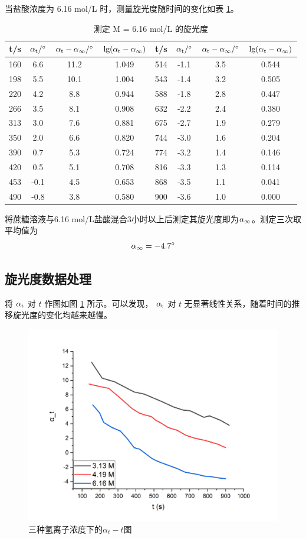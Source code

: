 \documentclass[cn,hazy,pku,12pt,normal,math=newtx,cite=super]{elegantnote}
\begin{document}
当盐酸浓度为 6.16 mol/L 时，测量旋光度随时间的变化如表 \ref{7}。
\begin{table}[h]
    \centering
    \caption{测定 M = 6.16 mol/L 的旋光度}
    \label{7}
    \begin{tabular}{cccc|cccc}
    \hline
    t/s & \multicolumn{1}{l}{$\rm \alpha_t / \degree$} & $\rm \alpha_t - \alpha_\infty / \degree$ & \multicolumn{1}{l|}{$\rm lg(\alpha_t-\alpha_\infty)$} & t/s & \multicolumn{1}{l}{$\rm \alpha_t / \degree$} & $\rm \alpha_t - \alpha_\infty / \degree$ & \multicolumn{1}{l}{$\rm lg(\alpha_t-\alpha_\infty)$} \\ \hline
    160 & 6.6  &11.2 & 1.049 & 514 & -1.1 & 3.5& 0.544 \\
    198 & 5.5  &10.1 & 1.004 & 543 & -1.4 & 3.2& 0.505 \\
    220 & 4.2  &8.8  & 0.944 & 588 & -1.8 & 2.8& 0.447 \\
    266 & 3.5  &8.1  & 0.908 & 632 & -2.2 & 2.4& 0.380 \\
    313 & 3.0  &7.6  & 0.881 & 675 & -2.7 & 1.9& 0.279 \\
    350 & 2.0  & 6.6 & 0.820 & 744 & -3.0 & 1.6& 0.204 \\
    390 & 0.7  &5.3  & 0.724 & 774 & -3.2 & 1.4& 0.146 \\
    420 & 0.5  &5.1  & 0.708 & 816 & -3.3 & 1.3& 0.114 \\
    453 & -0.1 & 4.5 & 0.653 & 868 & -3.5 & 1.1& 0.041 \\
    490 & -0.8 &3.8  & 0.580 & 900 & -3.6 & 1.0& 0.000 \\ \hline
    \end{tabular}
\end{table}

将蔗糖溶液与6.16 mol/L盐酸混合3小时以上后测定其旋光度即为$\rm \alpha_\infty$。测定三次取平均值为
$$\alpha_\infty = -4.7\degree$$

\subsection{旋光度数据处理}
将 $\rm \alpha_t$ 对 $t$ 作图如图 \ref{7.5} 所示。可以发现， $\rm \alpha_t$ 对 $t$ 无显著线性关系，随着时间的推移旋光度的变化均越来越慢。

\begin{figure}[htbp]
    \centering
    \includegraphics[width = .70\textwidth]{image/Graph9.png}
    \caption{三种氢离子浓度下的$\alpha_t - t $图}\label{7.5}
\end{figure}
\end{document}
